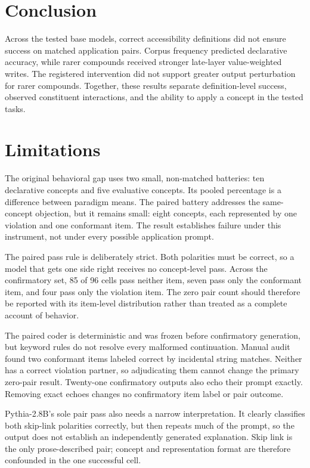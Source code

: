 \documentclass[
  english,
]{article}
\begin{document}
\section{Conclusion}\label{conclusion}

Across the tested base models, correct accessibility definitions did not ensure success on matched application pairs. Corpus frequency predicted declarative accuracy, while rarer compounds received stronger late-layer value-weighted writes. The registered intervention did not support greater output perturbation for rarer compounds. Together, these results separate definition-level success, observed constituent interactions, and the ability to apply a concept in the tested tasks.

\section{Limitations}\label{limitations}

The original behavioral gap uses two small, non-matched batteries: ten declarative concepts and five evaluative concepts. Its pooled percentage is a difference between paradigm means. The paired battery addresses the same-concept objection, but it remains small: eight concepts, each represented by one violation and one conformant item. The result establishes failure under this instrument, not under every possible application prompt.

The paired pass rule is deliberately strict. Both polarities must be correct, so a model that gets one side right receives no concept-level pass. Across the confirmatory set, 85 of 96 cells pass neither item, seven pass only the conformant item, and four pass only the violation item. The zero pair count should therefore be reported with its item-level distribution rather than treated as a complete account of behavior.

The paired coder is deterministic and was frozen before confirmatory generation, but keyword rules do not resolve every malformed continuation. Manual audit found two conformant items labeled correct by incidental string matches. Neither has a correct violation partner, so adjudicating them cannot change the primary zero-pair result. Twenty-one confirmatory outputs also echo their prompt exactly. Removing exact echoes changes no confirmatory item label or pair outcome.

Pythia-2.8B's sole pair pass also needs a narrow interpretation. It clearly classifies both skip-link polarities correctly, but then repeats much of the prompt, so the output does not establish an independently generated explanation. Skip link is the only prose-described pair; concept and representation format are therefore confounded in the one successful cell.
\end{document}
